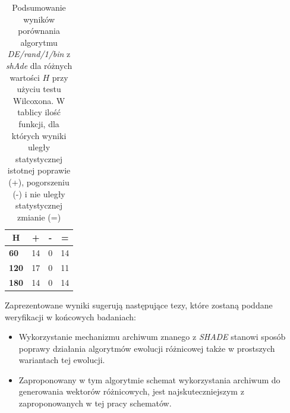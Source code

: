 \documentclass[12pt,a4paper]{report}
\begin{document}
{{{{{{{\begin{table}[h]
\centering
\caption{Podsumowanie wyników porównania algorytmu \emph{DE/rand/1/bin} z \emph{shAde} dla różnych wartości $H$ przy użyciu testu Wilcoxona. W tablicy ilość funkcji, dla których wyniki uległy statystycznej istotnej poprawie (+), pogorszeniu (-) i nie uległy statystycznej zmianie (=)}
\label{Anal13Sum}
\begin{tabular}{|l|l|l|l|}
\hline
\multicolumn{1}{|c|}{{\bf H}} & \multicolumn{1}{c|}{{\bf +}} & \multicolumn{1}{c|}{{\bf -}} & \multicolumn{1}{c|}{{\bf =}} \\ \hline
{\bf 60}                      & 14                           & 0                            & 14                           \\ \hline
{\bf 120}                     & 17                           & 0                            & 11                           \\ \hline
{\bf 180}                     & 14                           & 0                            & 14                           \\ \hline
\end{tabular}
\end{table}


\par{
Zaprezentowane wyniki sugerują następujące tezy, które zostaną poddane weryfikacji w końcowych badaniach:
\begin{itemize}
\item Wykorzystanie mechanizmu archiwum znanego z \emph{SHADE} stanowi sposób poprawy działania algorytmów ewolucji różnicowej także w prostszych wariantach tej ewolucji.
\item Zaproponowany w tym algorytmie schemat wykorzystania archiwum do generowania wektorów różnicowych, jest najskuteczniejszym z zaproponowanych w tej pracy schematów.
\end{itemize}
}


}}}}}}}
\end{document}
